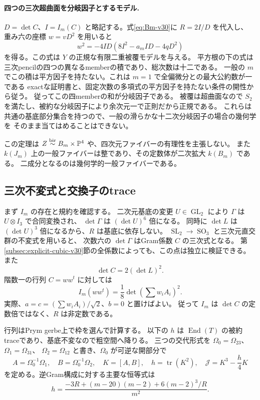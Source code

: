 \paragraph{四つの三次超曲面を分岐因子とするモデル.}
$D=\det C$、$I=I_m(C)$ と略記する。式\eqref{eq:Bm-v30}に $R=2I/D$ を代入し、
重み六の座標 $w=vD^2$ を用いると
\begin{equation}\label{eq:four-cubics-double-cover-v30}
 w^2=-4ID(8I^2-a_mID-4qD^2)
\end{equation}
を得る。この式は $Y$ の正規な有限二重被覆モデルを与える。
平方根の下の式は三次pencilの四つの異なるmemberの積であり、総次数は十二である。
一般の $m$ でこの積は平方因子を持たない。これは $m=1$ で全偏微分との最大公約数が一である
exactな証明書と、固定次数の多項式の平方因子を持たない条件の開性から従う。
従ってこの四memberの和が分岐因子である。
被覆は超曲面なので $S_2$ を満たし、被約な分岐因子により余次元一で正則だから正規である。
これらは共通の基底部分集合を持つので、一般の滑らかな十二次分岐因子の場合の幾何学を
そのまま当てはめることはできない。

この定理は $Z\mathrel{\overset{\mathrm{bir}}{\sim}} B_m\times\mathbb P^4$ や、四次元ファイバーの有理性を主張しない。
また $k(J_m)$ 上の一般ファイバーは整であり、その定数体が二次拡大 $k(B_m)$ である。
二成分となるのは幾何学的一般ファイバーである。

\subsection{三次不変式と交換子のtrace}

まず $I_m$ の存在と規約を確認する。
二次元基底の変更 $U\in\operatorname{GL}_2$ により $\Gamma$ は $U\otimes I_3$ で合同変換され、
$\det\Gamma$ は $(\det U)^6$ 倍になる。
同時に $\det L$ は $(\det U)^3$ 倍になるから、$R$ は基底に依存しない。
$\operatorname{SL}_2\to\operatorname{SO}_3$ と三次元直交群の不変式を用いると、
次数六の $\det\Gamma$ はGram係数 $C$ の三次式となる。
第\ref{subsec:explicit-cubic-v30}節の全係数によっても、この点は独立に検証できる。
また
\[
 \det C=2(\det L)^2.
\]
階数一の行列 $C=ww^t$ に対しては
\begin{equation}\label{eq:rankone-I-v30}
 I_m(ww^t)=\frac18\det\!\left(\sum w_iA_i\right)^2.
\end{equation}
実際、$a=c=(\sum w_iA_i)/\sqrt2$、$b=0$ と置けばよい。
従って $I_m$ は $\det C$ の定数倍ではなく、$R$ は非定数である。

行列はPrym gerbe上で枠を選んで計算する。
以下の $h$ は $\operatorname{End}(T)$ の被約traceであり、基底不変なので粗空間へ降りる。
三つの交代形式を $\Omega_0=\Omega_{23}$、$\Omega_1=\Omega_{31}$、
$\Omega_2=\Omega_{12}$ と書き、$\Omega_0$ が可逆な開部分で
\begin{equation}\label{eq:commutator-v30}
 A=\Omega_0^{-1}\Omega_1,\quad B=\Omega_0^{-1}\Omega_2,\quad
 K=[A,B],\quad h=\operatorname{tr}(K^2),\quad
 \mathscr J=K^3-\frac h4K
\end{equation}
を定める。逆Gram構成に対する主要な恒等式は
\begin{equation}\label{eq:trace-R-v30}
 \boxed{\quad h=
 \frac{-3R+(m-20)(m-2)+6(m-2)^3/R}{m^2}.\quad}
\end{equation}

